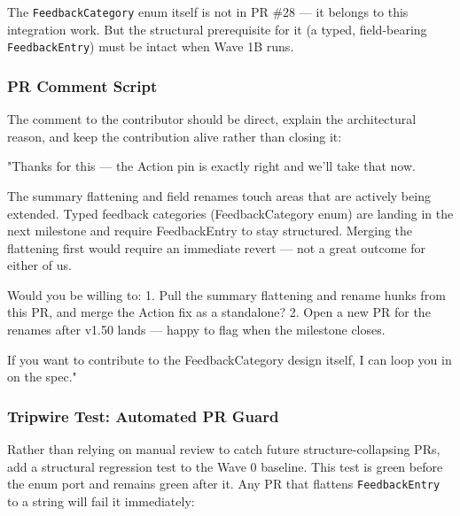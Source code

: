 \documentclass[11pt,letterpaper]{article}
\begin{document}
The \texttt{FeedbackCategory} enum itself is not in PR \#28 — it belongs to this integration work. But the structural prerequisite for it (a typed, field-bearing \texttt{FeedbackEntry}) must be intact when Wave 1B runs.

\subsubsection{PR Comment Script}

The comment to the contributor should be direct, explain the architectural reason, and keep the contribution alive rather than closing it:

\begin{asciibox}
  "Thanks for this — the Action pin is exactly right and we'll take that now.

  The summary flattening and field renames touch areas that are actively
  being extended. Typed feedback categories (FeedbackCategory enum) are
  landing in the next milestone and require FeedbackEntry to stay
  structured. Merging the flattening first would require an immediate
  revert — not a great outcome for either of us.

  Would you be willing to:
    1. Pull the summary flattening and rename hunks from this PR, and
       merge the Action fix as a standalone?
    2. Open a new PR for the renames after v1.50 lands — happy to flag
       when the milestone closes.

  If you want to contribute to the FeedbackCategory design itself, I can
  loop you in on the spec."
\end{asciibox}

\subsubsection{Tripwire Test: Automated PR Guard}

Rather than relying on manual review to catch future structure-collapsing PRs, add a structural regression test to the Wave 0 baseline. This test is green before the enum port and remains green after it. Any PR that flattens \texttt{FeedbackEntry} to a string will fail it immediately:
\end{document}
